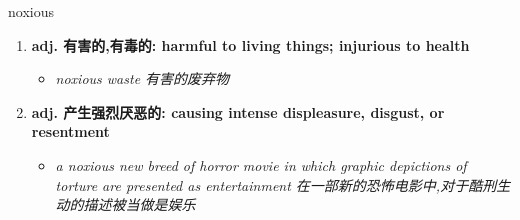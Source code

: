
\begin{frame}
{\huge noxious}
\begin{center}
\begin{enumerate}\Large
  \item \textbf{adj. 有害的,有毒的: harmful to living things; injurious to health}
  \begin{itemize}
    \item \em{\Large{noxious waste 有害的废弃物}}
  \end{itemize}
  \item \textbf{adj. 产生强烈厌恶的: causing intense displeasure, disgust, or resentment}
  \begin{itemize}
    \item \em{\Large{a noxious new breed of horror movie in which graphic depictions of torture are presented as entertainment 在一部新的恐怖电影中,对于酷刑生动的描述被当做是娱乐}}
  \end{itemize}
\end{enumerate}
\end{center}
\end{frame}
